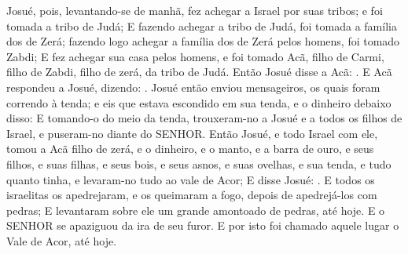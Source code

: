 {Josué, pois, levantando-se de manhã, fez achegar a Israel por suas tribos; e foi tomada a tribo de Judá;
E fazendo achegar a tribo de Judá, foi tomada a família dos de Zerá; fazendo logo achegar a família dos de Zerá pelos homens, foi tomado Zabdi;
E fez achegar sua casa pelos homens, e foi tomado Acã, filho de Carmi, filho de Zabdi, filho de zerá, da tribo de Judá.
Então Josué disse a Acã: .
E Acã respondeu a Josué, dizendo: .
Josué então enviou mensageiros, os quais foram correndo à tenda; e eis que estava escondido em sua tenda, e o dinheiro debaixo disso:
E tomando-o do meio da tenda, trouxeram-no a Josué e a todos os filhos de Israel, e puseram-no diante do SENHOR.
Então Josué, e todo Israel com ele, tomou a Acã filho de zerá, e o dinheiro, e o manto, e a barra de ouro, e seus filhos, e suas filhas, e seus bois, e seus asnos, e suas ovelhas, e sua tenda, e tudo quanto tinha, e levaram-no tudo ao vale de Acor;
E disse Josué: . E todos os israelitas os apedrejaram, e os queimaram a fogo, depois de apedrejá-los com pedras;
E levantaram sobre ele um grande amontoado de pedras, até hoje. E o SENHOR se apaziguou da ira de seu furor. E por isto foi chamado aquele lugar o Vale de Acor, até hoje.

\par }

